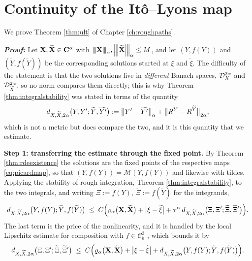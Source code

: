 \section{Continuity of the Itô--Lyons map}\label{app:proof:ult}
We prove Theorem \ref{thm:ult} of Chapter \ref{ch:roughpaths}.

\textbf{\textit{Proof:}} Let $\mathbf{X},\widetilde{\mathbf{X}}\in\mathbf{C}^{\alpha}$ with
${\left\vert\kern-0.25ex\left\vert\kern-0.25ex\left\vert \mathbf{X} \right\vert\kern-0.25ex\right\vert\kern-0.25ex\right\vert}_\alpha,{\left\vert\kern-0.25ex\left\vert\kern-0.25ex\left\vert \widetilde{\mathbf{X}} \right\vert\kern-0.25ex\right\vert\kern-0.25ex\right\vert}_\alpha\leq M$, and let $(Y,f(Y))$ and
$(\widetilde Y, f(\widetilde Y))$ be the corresponding solutions started at $\xi$ and
$\widetilde\xi$. The difficulty of the statement is that the two solutions live in \emph{different}
Banach spaces, $\mathcal{D}^{2\alpha}_{X}$ and $\mathcal{D}^{2\alpha}_{\widetilde X}$, so no norm compares them directly; this is why
Theorem \ref{thm:integralstability} was stated in terms of the quantity
\[
d_{X,\widetilde X,2\alpha}\bigl(Y,Y';\widetilde Y,\widetilde{Y'}\bigr)
:= \bigl\lVert Y' - \widetilde{Y'}\bigr\rVert_{\alpha} + \bigl\lVert R^{Y}-R^{\widetilde Y}\bigr\rVert_{2\alpha},
\]
which is not a metric but does compare the two, and it is this quantity that we estimate.

\medskip
\noindent\textbf{Step 1: transferring the estimate through the fixed point.} By Theorem
\ref{thm:rdeexistence} the solutions are the fixed points of the respective maps
\eqref{eq:picardmap}, so that
$(Y,f(Y)) = \mathcal{M}(Y,f(Y))$ and likewise with tildes. Applying the stability of rough
integration, Theorem \ref{thm:integralstability}, to the two integrals, and writing
$\Xi := f(Y)$, $\widetilde\Xi := f(\widetilde Y)$ for the integrands,
\begin{equation}\label{eq:ultstep1}
d_{X,\widetilde X,2\alpha}\bigl(Y, f(Y); \widetilde Y, f(\widetilde Y)\bigr)
\;\leq\; C\Bigl( \varrho_{\alpha}\bigl(\mathbf{X},\widetilde{\mathbf{X}}\bigr) + \bigl|\xi-\widetilde\xi\bigr|
+ \tau^{\alpha}\,d_{X,\widetilde X,2\alpha}\bigl(\Xi,\Xi';\widetilde\Xi,\widetilde\Xi'\bigr)\Bigr).
\end{equation}
The last term is the price of the nonlinearity, and it is handled by the local Lipschitz estimate
for composition with $f\in\mathcal{C}^3_b$ \cite[Thm.\ 7.6]{frizhairer2020}, which bounds it by
\[
d_{X,\widetilde X,2\alpha}\bigl(\Xi,\Xi';\widetilde\Xi,\widetilde\Xi'\bigr)
\;\leq\; C\Bigl( \varrho_{\alpha}\bigl(\mathbf{X},\widetilde{\mathbf{X}}\bigr) + \bigl|\xi-\widetilde\xi\bigr|
+ d_{X,\widetilde X,2\alpha}\bigl(Y,f(Y);\widetilde Y, f(\widetilde Y)\bigr) \Bigr).
\]

